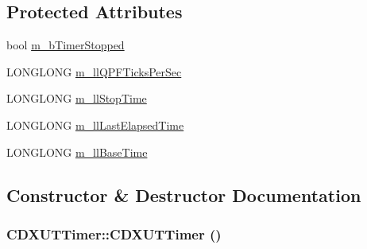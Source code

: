 \subsection*{Protected Attributes}
\begin{DoxyCompactItemize}
\item 
bool \hyperlink{class_c_d_x_u_t_timer_ab6969b767724f796674c46618a9cef34}{m\_\-bTimerStopped}
\item 
LONGLONG \hyperlink{class_c_d_x_u_t_timer_a5d02af56056a52900a24a0b2a4890ebd}{m\_\-llQPFTicksPerSec}
\item 
LONGLONG \hyperlink{class_c_d_x_u_t_timer_ad27f97d31ae946f1c0b55ddaa11902cb}{m\_\-llStopTime}
\item 
LONGLONG \hyperlink{class_c_d_x_u_t_timer_a9dc6f56a2fddb4c275d33ca8858f2367}{m\_\-llLastElapsedTime}
\item 
LONGLONG \hyperlink{class_c_d_x_u_t_timer_ab756323e5a37b91a5eab6275a27a734a}{m\_\-llBaseTime}
\end{DoxyCompactItemize}


\subsection{Constructor \& Destructor Documentation}
\hypertarget{class_c_d_x_u_t_timer_ac5c3ca2e7b862f4283ecbe9fd749d906}{
\subsubsection[{CDXUTTimer}]{\setlength{\rightskip}{0pt plus 5cm}CDXUTTimer::CDXUTTimer ()}}
\label{class_c_d_x_u_t_timer_ac5c3ca2e7b862f4283ecbe9fd749d906}


